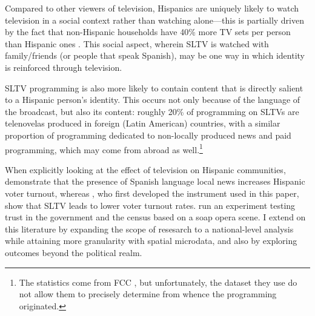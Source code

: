\documentclass[11pt]{article}
\begin{document}
 Compared to other viewers of television, Hispanics are uniquely likely to watch television in a social context rather than watching alone---this is partially driven by the fact that non-Hispanic households have 40\% more TV sets per person than Hispanic ones \citep{coghill_tuning_2018}. This social aspect, wherein SLTV is watched with family/friends (or people that speak Spanish), may be one way in which identity is reinforced through television. 

SLTV programming is also more likely to contain content that is directly salient to a Hispanic person's identity. This occurs not only because of the language of the broadcast, but also its content: roughly 20\% of programming on SLTVs are telenovelas produced in foreign (Latin American) countries, with a similar proportion of programming dedicated to non-locally produced news and paid programming, which may come from abroad as well.\footnote{ The statistics come from FCC \cite{noauthor_hispanic_2016}, but unfortunately, the dataset they use do not allow them to precisely determine from whence the programming originated. }

When explicitly looking at the effect of television on Hispanic communities, \cite{oberholzer-gee_media_2009} demonstrate that the presence of Spanish language local news increases Hispanic voter turnout, whereas  \cite{velez_tuning_2019}, who first developed the instrument used in this paper, show that SLTV leads to lower voter turnout rates. \cite{trujillo_devil_2012} run an experiment testing trust in the government and the census based on a soap opera scene. I extend on this literature by expanding the scope of resesarch to a national-level analysis while attaining more granularity with spatial microdata, and also by exploring outcomes beyond the political realm.

\end{document}
